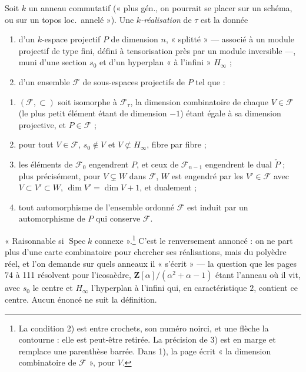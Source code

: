 \documentclass[11pt,a4paper]{article}
\begin{document}
Soit $k$ un anneau commutatif (« plus gén., on pourrait se placer sur un schéma,
ou sur un topos loc.\ annelé »). Une \emph{$k$-réalisation} de $\tau$ est la
donnée
\begin{enumerate}
  \item[a)] d'un $k$-espace projectif $P$ de dimension $n$, « splitté » ---
    associé à un module projectif de type fini, défini à tensorisation près par
    un module inversible ---, muni d'une section $s_0$ et d'un hyperplan « à
    l'infini » $H_\infty$ ;
  \item[b)] d'un ensemble $\mathcal{F}$ de sous-espaces projectifs de $P$ tel
    que :
\end{enumerate}
\begin{enumerate}
      \item[1)] $(\mathcal{F}, \subset)$ soit isomorphe à $\mathcal{F}_\tau$, la
        dimension combinatoire de chaque $V \in \mathcal{F}$ (le plus petit
        élément étant de dimension $-1$) étant égale à sa dimension projective,
        et $P \in \mathcal{F}$ ;
      \item[2)] pour tout $V \in \mathcal{F}$, $s_0 \notin V$ et $V \not\subset
        H_\infty$, fibre par fibre ;
      \item[3)] les éléments de $\mathcal{F}_0$ engendrent $P$, et ceux de
        $\mathcal{F}_{n-1}$ engendrent le dual $\check P$ ; plus précisément,
        pour $V \subsetneq W$ dans $\mathcal{F}$, $W$ est engendré par les $V' \in
        \mathcal{F}$ avec $V \subset V' \subset W$, $\dim V' = \dim V + 1$, et
        dualement ;
      \item[4)] tout automorphisme de l'ensemble ordonné $\mathcal{F}$ est
        induit par un automorphisme de $P$ qui conserve $\mathcal{F}$.
\end{enumerate}
« Raisonnable si $\operatorname{Spec} k$ connexe ».\footnote{La condition 2)
est entre crochets, son numéro noirci, et une flèche la contourne : elle est
peut-être retirée. La précision de 3) est en marge et remplace une parenthèse
barrée. Dans 1), la page écrit « la dimension combinatoire de $\mathcal{F}$ »,
pour $V$.} C'est le renversement annoncé : on ne part plus d'une carte
combinatoire pour chercher ses réalisations, mais du polyèdre réel, et l'on
demande sur quels anneaux il « s'écrit » --- la question que les pages 74 à 111
résolvent pour l'icosaèdre, $\mathbf{Z}[\alpha]/(\alpha^2 + \alpha - 1)$ étant
l'anneau où il vit, avec $s_0$ le centre et $H_\infty$ l'hyperplan à l'infini
qui, en caractéristique $2$, contient ce centre. Aucun énoncé ne suit la
définition.
\end{document}
